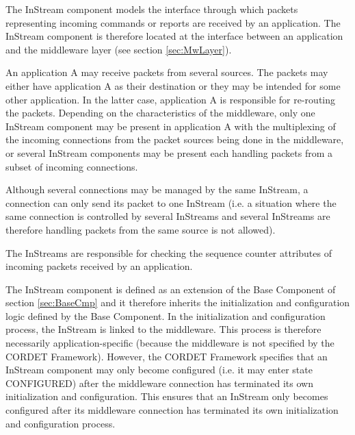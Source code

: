 The InStream component models the interface through which packets representing incoming commands or reports are received by an application. The InStream component is therefore located at the interface between an application and the middleware layer (see section \ref{sec:MwLayer}). 

An application A may receive packets from several sources. The packets may either have application A as their destination or they may be intended for some other application. In the latter case, application A is responsible for re-routing the packets. Depending on the characteristics of the middleware, only one InStream component may be present in application A with the multiplexing of the incoming connections from the packet sources being done in the middleware, or several InStream components may be present each handling packets from a subset of incoming connections. 

Although several connections may be managed by the same InStream, a connection can only send its packet to one InStream (i.e. a situation where the same connection is controlled by several InStreams and several InStreams are therefore handling packets from the same source is not allowed).


The InStreams are responsible for checking the sequence counter attributes of incoming packets received by an application.  

The InStream component is defined as an extension of the Base Component of section \ref{sec:BaseCmp} and it therefore inherits the initialization and configuration logic defined by the Base Component. In the initialization and configuration process, the InStream is linked to the middleware. This process is therefore necessarily application-specific (because the middleware is not specified by the CORDET Framework). However, the CORDET Framework specifies that an InStream component may only become configured (i.e. it may enter state CONFIGURED) after the middleware connection has terminated its own initialization and configuration. This ensures that an InStream only becomes configured after its middleware connection has terminated its own initialization and configuration process.

